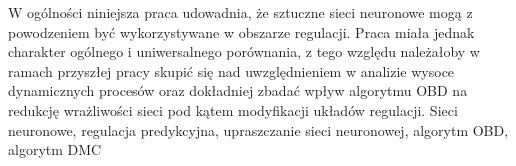 \documentclass[
    left=2.5cm,         %
    right=2.5cm,        %
    top=2.5cm,          %
    bottom=3cm,         %
    bindingoffset=6mm,  %
    nohyphenation=false %
]{eiti/eiti-thesis}
\begin{document}
\par W ogólności niniejsza praca udowadnia, że sztuczne sieci neuronowe mogą z powodzeniem być wykorzystywane w obszarze regulacji. Praca miała jednak charakter ogólnego i uniwersalnego porównania, z tego względu należałoby w ramach przyszłej pracy skupić się nad uwzględnieniem w analizie wysoce dynamicznych procesów oraz dokładniej zbadać wpływ algorytmu OBD na redukcję wrażliwości sieci pod kątem modyfikacji układów regulacji.
\slowakluczowe Sieci neuronowe, regulacja predykcyjna, upraszczanie sieci neuronowej, algorytm OBD, algorytm DMC


\cleardoublepage  %
\pagestyle{plain}
\makeauthorship

\cleardoublepage %
\tableofcontents

\cleardoublepage %
\pagestyle{headings}








\cleardoublepage %
\printbibliography

\newpage
\pagestyle{plain}

\vspace{0.8cm}
\acronymlist
{}
\end{document}
